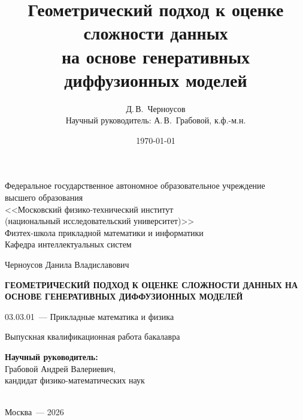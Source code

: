 \documentclass[14pt, a4paper]{extarticle}
\title{Геометрический подход к оценке сложности данных\\ на основе генеративных диффузионных моделей}
\author{Д.\,В.~Черноусов\\ \small Научный руководитель: А.\,В.~Грабовой, к.ф.-м.н.}
\date{\today}
\theoremstyle{definition}
\theoremstyle{plain}
\begin{document}
\thispagestyle{empty}
\begin{titlepage}
\begin{center}
Федеральное государственное автономное образовательное учреждение\\ высшего образования\\
<<Московский физико-технический институт\\
(национальный исследовательский университет)>>\\
Физтех-школа прикладной математики и информатики\\
Кафедра интеллектуальных систем
\end{center}

\vspace{0pt plus5fill}

\begin{center}
\large{Черноусов Данила Владиславович}
\end{center}

\vspace{0pt}

\begin{center}
\textbf{\large{\MakeUppercase{Геометрический подход к оценке сложности данных на основе генеративных диффузионных моделей}}}
\end{center}

\vspace{0pt}

\begin{center}
03.03.01~--- Прикладные математика и физика
\end{center}

\vspace{0pt}

\begin{center}
Выпускная квалификационная работа бакалавра
\end{center}

\vspace{0pt plus2fill}

\begin{center}
\hfill\parbox{8.4cm}{\textbf{Научный руководитель:}\\
Грабовой Андрей Валериевич,\\
кандидат физико-математических наук}\\
\vspace{0pt plus4fill}
Москва~--- 2026
\end{center}
\end{titlepage}
\setcounter{page}{2}
\end{document}
